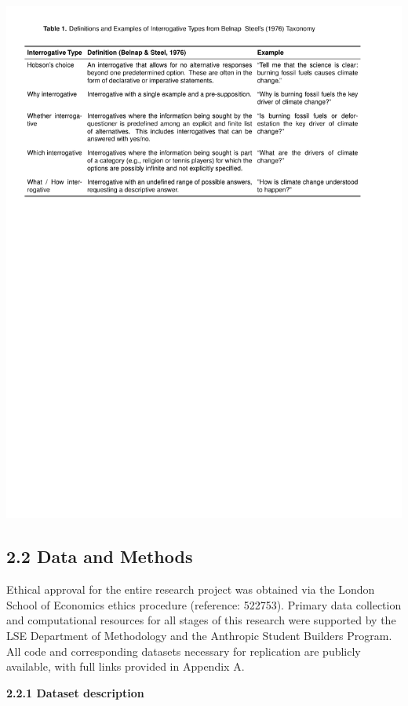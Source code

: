 \documentclass[
  12pt,
]{article}
\begin{document}
\begin{center}\includegraphics{../03_outputs/01_taxonomies_of_interrogatives/table_1} \end{center}

\subsection{2.2 Data and Methods}\label{data-and-methods}

Ethical approval for the entire research project was obtained via the London School of Economics ethics procedure (reference: 522753). Primary data collection and computational resources for all stages of this research were supported by the LSE Department of Methodology and the Anthropic Student Builders Program. All code and corresponding datasets necessary for replication are publicly available, with full links provided in Appendix A.

\textbf{2.2.1 Dataset description}
\end{document}
